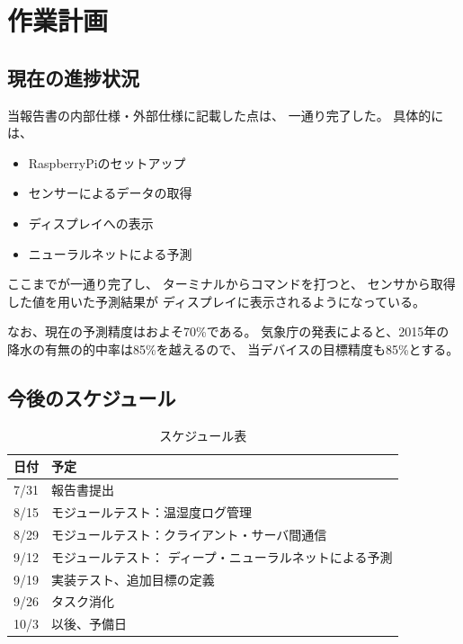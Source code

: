 \documentclass{jsarticle}
\begin{document}
    \section{作業計画}
      \subsection{現在の進捗状況}
        当報告書の内部仕様・外部仕様に記載した点は、
        一通り完了した。
        具体的には、

        \begin{itemize}
          \item RaspberryPiのセットアップ
          \item センサーによるデータの取得
          \item ディスプレイへの表示
          \item ニューラルネットによる予測
        \end{itemize}

        ここまでが一通り完了し、
        ターミナルからコマンドを打つと、
        センサから取得した値を用いた予測結果が
        ディスプレイに表示されるようになっている。

        なお、現在の予測精度はおよそ70\%である。
        気象庁の発表によると、2015年の
        降水の有無の的中率は85\%を越える\cite{jma}ので、
        当デバイスの目標精度も85\%とする。

      \subsection{今後のスケジュール}

        \begin{center}
          \begin{table}[H]
            \centering
            \caption{スケジュール表}
            \begin{tabular}{|c|l|} \hline
              \hspace{5mm}日付\hspace{5mm} & \hspace{30mm}予定 \\ \hline \hline
              7/31 & 報告書提出 \\
              8/15 & モジュールテスト：温湿度ログ管理 \\
              8/29 & モジュールテスト：クライアント・サーバ間通信 \\
              9/12 & モジュールテスト：
                        ディープ・ニューラルネットによる予測 \\
              9/19 & 実装テスト、追加目標の定義 \\
              9/26 & タスク消化 \\
              10/3 & 以後、予備日 \\ \hline
            \end{tabular}
            \label{tb:schedule}
          \end{table}
        \end{center}
\end{document}

